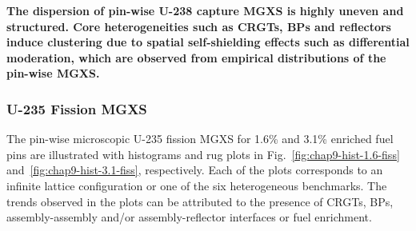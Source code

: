 

\begin{emphbox}
\textbf{The dispersion of pin-wise U-238 capture \ac{MGXS} is highly uneven and structured. Core heterogeneities such as \acp{CRGT}, \acp{BP} and reflectors induce clustering due to spatial self-shielding effects such as differential moderation, which are observed from empirical distributions of the pin-wise \ac{MGXS}.}
\end{emphbox}

\subsubsection{U-235 Fission MGXS}
\label{subsubsec:chap9-histograms-fiss}

The pin-wise microscopic U-235 fission \ac{MGXS} for 1.6\% and 3.1\% enriched fuel pins are illustrated with histograms and rug plots in Fig.~\ref{fig:chap9-hist-1.6-fiss} and~\ref{fig:chap9-hist-3.1-fiss}, respectively. Each of the plots corresponds to an infinite lattice configuration or one of the six heterogeneous benchmarks. The trends observed in the plots can be attributed to the presence of \acp{CRGT}, \acp{BP}, assembly-assembly and/or assembly-reflector interfaces or fuel enrichment. 

